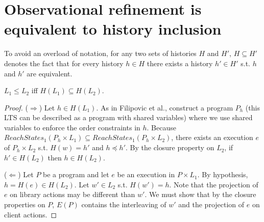\section{Observational refinement is equivalent to history inclusion}

To avoid an overload of notation, for any two sets of histories $H$ and $H'$, $H\subseteq H'$ 
denotes the fact that for every history $h\in H$ there exists a history $h'\in H'$ s.t. 
$h$ and $h'$ are equivalent.

\begin{theorem}

  $L_1 \leq L_2$ iff $H(L_1) \subseteq H(L_2)$.

\end{theorem}

\begin{proof}

  ($\Rightarrow$) Let $h\in H(L_1)$. As in Filipovic et al., construct a
  program $P_h$ (this LTS can be described as a program with shared variables)
  where we use shared variables to enforce the order constraints in $h$.
  Because $ReachStates_1(P_h\times L_1) \subseteq ReachStates_1(P_h\times
  L_2)$, there exists an execution $e$ of $P_h\times L_2$ s.t. $H(w)=h'$ and
  $h\preceq h'$. By the closure property on $L_2$, if $h'\in H(L_2)$ then $h\in
  H(L_2)$.

  ($\Leftarrow$) Let $P$ be a program and let $e$ be an execution in $P\times
  L_1$. By hypothesis, $h=H(e)\in H(L_2)$. Let $w'\in L_2$ s.t. $H(w')=h$. Note
  that the projection of $e$ on library actions may be different than $w'$. We
  must show that by the closure properties on $P$, $E(P)$ contains the
  interleaving of $w'$ and the projection of $e$ on client actions.

\end{proof}
